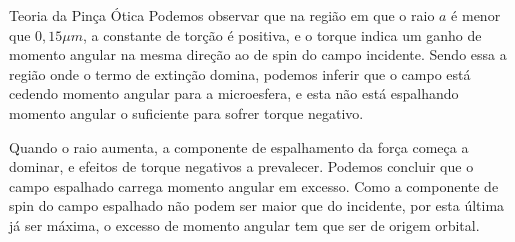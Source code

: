\begin{chapter}{Teoria da Pinça Ótica}
Podemos observar que na região em que o raio $a$ é menor que $0,15 \mu m$, a constante de torção é positiva, e o torque indica um ganho de momento angular na mesma direção ao de spin do campo incidente. Sendo essa a região onde o termo de extinção domina, podemos inferir que o campo está cedendo momento angular para a microesfera, e esta não está espalhando momento angular o suficiente para sofrer torque negativo.


Quando o raio aumenta, a componente de espalhamento da força começa a dominar, e efeitos de torque negativos a prevalecer. Podemos concluir que o campo espalhado carrega momento angular em excesso. Como a componente de spin do campo espalhado não podem ser maior que do incidente, por esta última já ser máxima, o excesso de momento angular tem que ser de origem orbital. 

\end{chapter}
